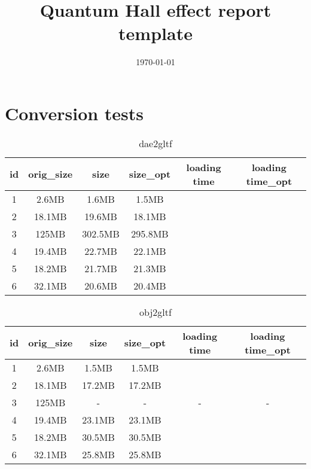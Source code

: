 \documentclass[a4paper]{article}
\title{Quantum Hall effect report template}
\date{\today}
\begin{document}
\section*{Conversion tests}

\begin{table}[h]
\begin{tabular}{cccccc}
id & orig\_size & size & size\_opt & loading time & loading time\_opt \\ \hline
1  & 2.6MB & 1.6MB& 1.5MB     &              &                   \\
2  & 18.1MB & 19.6MB& 18.1MB  &              &                   \\
3  & 125MB & 302.5MB & 295.8MB &              &                   \\
4  & 19.4MB & 22.7MB &  22.1MB &                 &  \\
5  & 18.2MB & 21.7MB & 21.3MB &              &                   \\
6  & 32.1MB & 20.6MB & 20.4MB &              &                  
\end{tabular}
\caption{dae2gltf}
\end{table}

\begin{table}[h]
\begin{tabular}{cccccc}
id & orig\_size & size & size\_opt & loading time & loading time\_opt \\ \hline
1  & 2.6MB & 1.5MB& 1.5MB     &              &                   \\
2  & 18.1MB & 17.2MB& 17.2MB  &              &                   \\
3  & 125MB & - & - &       -       &         -          \\
4  & 19.4MB & 23.1MB &  23.1MB &                 &  \\
5  & 18.2MB & 30.5MB & 30.5MB &              &                   \\
6  & 32.1MB & 25.8MB & 25.8MB &              &                  
\end{tabular}
\caption{obj2gltf}
\end{table}
\end{document}
